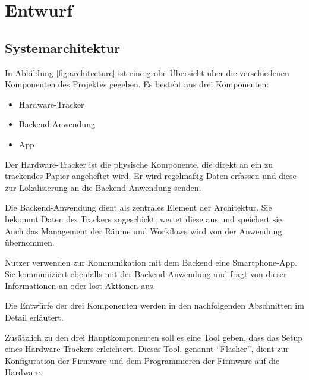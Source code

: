 \chapter{Entwurf} \label{chap:entwurf}

\section{Systemarchitektur} \label{sec:systemarchitektur}

In Abbildung \ref{fig:architecture} ist eine grobe Übersicht über die verschiedenen Komponenten des Projektes gegeben.
Es besteht aus drei Komponenten:
\begin{itemize}
	\item Hardware-Tracker
	\item Backend-Anwendung
	\item App
\end{itemize}

Der Hardware-Tracker ist die physische Komponente, die direkt an ein zu trackendes Papier angeheftet wird.
Er wird regelmäßig Daten erfassen und diese zur Lokalisierung an die Backend-Anwendung senden.

Die Backend-Anwendung dient als zentrales Element der Architektur.
Sie bekommt Daten des Trackers zugeschickt, wertet diese aus und speichert sie.
Auch das Management der Räume und Workflows wird von der Anwendung übernommen.

Nutzer verwenden zur Kommunikation mit dem Backend eine Smartphone-App.
Sie kommuniziert ebenfalls mit der Backend-Anwendung und fragt von dieser Informationen an oder löst Aktionen aus.

Die Entwürfe der drei Komponenten werden in den nachfolgenden Abschnitten im Detail erläutert.

Zusätzlich zu den drei Hauptkomponenten soll es eine Tool geben, dass das Setup eines Hardware-Trackers erleichtert.
Dieses Tool, genannt \enquote{Flasher}, dient zur Konfiguration der Firmware und dem Programmieren der Firmware auf die Hardware.

